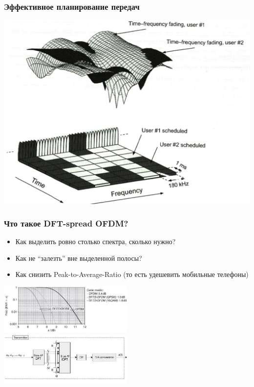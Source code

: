 \documentclass[utf8]{beamer}
\begin{document}
\begin{frame}
\frametitle{Эффективное планирование передач}
\centering
\includegraphics[width=\textwidth]{pic/scheduling.png}
\end{frame}
\begin{frame}
\frametitle{Что такое DFT-spread OFDM?}
\begin{itemize}
\item Как выделить ровно столько спектра, сколько нужно?
\item Как не ``залезть'' вне выделенной полосы?
\item Как снизить Peak-to-Average-Ratio (то есть удешевить мобильные телефоны)
\end{itemize}
\includegraphics[width=0.5\textwidth]{pic/par-for-ofdm-and-ds-fdma.jpg}
\includegraphics[width=0.5\textwidth]{pic/dts-fdma.jpg}
\end{frame}
\end{document}
